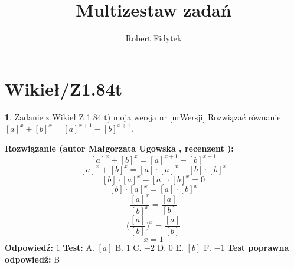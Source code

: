 \documentclass[12pt, a4paper]{article}
\title{Multizestaw zadań}
\author{Robert Fidytek}
\date{}
\theoremstyle{definition} %
\newtheorem{zad}{}
\newcommand{\kategoria}[1]{\section{#1}} %
\newcommand{\zadStart}[1]{\begin{zad}#1\newline} %
\newcommand{\zadStop}{\end{zad}}   %
\newcommand{\rozwStart}[2]{\noindent \textbf{Rozwiązanie (autor #1 , recenzent #2): }\newline} %
\newcommand{\rozwStop}{\newline}                                            %
\newcommand{\odpStart}{\noindent \textbf{Odpowiedź:}\newline}    %
\newcommand{\odpStop}{\newline}                                             %
\newcommand{\testStart}{\noindent \textbf{Test:}\newline} %
\newcommand{\testStop}{\newline} %
\newcommand{\kluczStart}{\noindent \textbf{Test poprawna odpowiedź:}\newline} %
\newcommand{\kluczStop}{\newline} %
\begin{document}
\maketitle


\kategoria{Wikieł/Z1.84t}
\zadStart{Zadanie z Wikieł Z 1.84 t) moja wersja nr [nrWersji]}
Rozwiązać równanie ${[a]}^x + {[b]}^x= {[a]}^{x+1} -[b]^{x+1}$.
\zadStop
\rozwStart{Małgorzata Ugowska}{}
$${[a]}^x + {[b]}^x= {[a]}^{x+1} -[b]^{x+1}$$
$${[a]}^x + {[b]}^x= [a] \cdot {[a]}^{x} -[b] \cdot [b]^{x}$$
$$[b] \cdot {[a]}^{x} -[a] \cdot [b]^{x} = 0$$
$$[b] \cdot {[a]}^{x} =[a] \cdot [b]^{x}$$
$$\frac{{[a]}^{x}}{[b]^{x}} =\frac{[a]}{[b]}$$
$$\Big(\frac{[a]}{[b]}\Big)^x =\frac{[a]}{[b]}$$
$$x=1$$
\rozwStop
\odpStart
$1$
\odpStop
\testStart
A. $[a]$
B. $1$
C. $-2$
D. $0$
E. $[b]$
F. $-1$
\testStop
\kluczStart
B
\kluczStop
\end{document}
